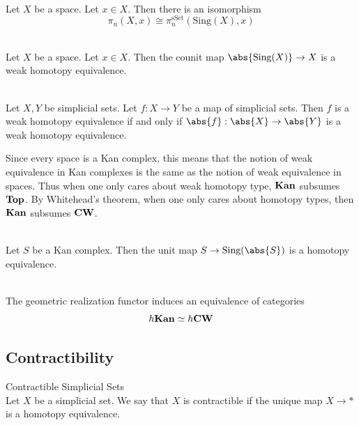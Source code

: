 \documentclass[a4paper]{article}
\begin{document}
\begin{prp}{}{}\\
Let $X$ be a space. Let $x\in X$. Then there is an isomorphism $$\pi_n(X,x)\cong\pi_n^\text{sSet}(\text{Sing}(X),x)$$
\end{prp}

\begin{crl}{}{}\\
Let $X$ be a space. Let $x\in X$. Then the counit map $\abs{\text{Sing}(X)}\to X$ is a weak homotopy equivalence. 
\end{crl}

\begin{crl}{}{}\\
Let $X,Y$ be simplicial sets. Let $f:X\to Y$ be a map of simplicial sets. Then $f$ is a weak homotopy equivalence if and only if $\abs{f}:\abs{X}\to\abs{Y}$ is a weak homotopy equivalence. 
\end{crl}

Since every space is a Kan complex, this means that the notion of weak equivalence in Kan complexes is the same as the notion of weak equivalence in spaces. Thus when one only cares about weak homotopy type, $\bold{Kan}$ subsumes $\bold{Top}$. By Whitehead's theorem, when one only cares about homotopy types, then $\bold{Kan}$ subsumes $\bold{CW}$. 

\begin{prp}{}{}\\
Let $S$ be a Kan complex. Then the unit map $S\to\text{Sing}(\abs{S})$ is a homotopy equivalence. 
\end{prp}

\begin{crl}{}{}\\
The geometric realization functor induces an equivalence of categories $$h\bold{Kan}\simeq h\bold{CW}$$
\end{crl}

\subsection{Contractibility}
\begin{defn}{Contractible Simplicial Sets}{}\\
Let $X$ be a simplicial set. We say that $X$ is contractible if the unique map $X\to\ast$ is a homotopy equivalence. 
\end{defn}
\end{document}
